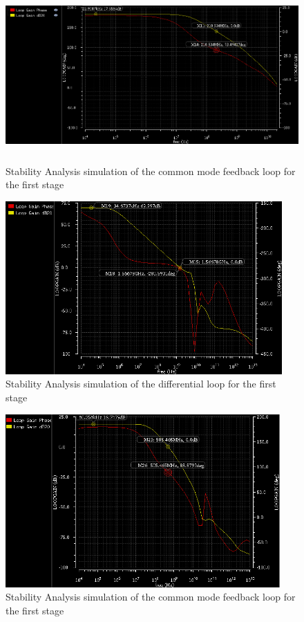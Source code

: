 \documentclass[conference]{IEEEtran}
\begin{document}
\begin{figure}[H]
\centering
\includegraphics[height=250px]{piktures/st1_cm_ac}
\caption{Stability Analysis simulation of the common mode feedback loop for the first stage}
\label{fig:st1_cm_ac}
\end{figure}





\begin{figure}[H]
\centering
\includegraphics[height=250px]{piktures/st2_diff_ac}
\caption{Stability Analysis simulation of the differential loop for the first stage}
\label{fig:st2_diff_ac}
\end{figure}

\begin{figure}[H]
\centering
\includegraphics[height=250px]{piktures/st2_cm_ac}
\caption{Stability Analysis simulation of the common mode feedback loop for the first stage}
\label{fig:st2_cm_ac}
\end{figure}
\end{document}
